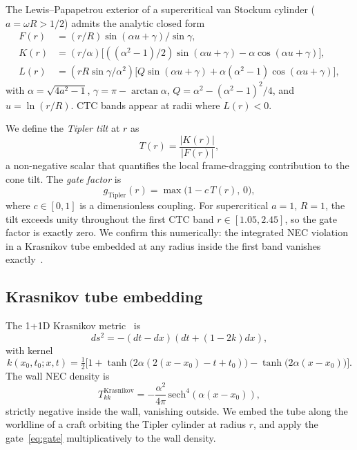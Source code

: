\documentclass[11pt,a4paper]{article}
\begin{document}
The Lewis--Papapetrou exterior of a supercritical van Stockum cylinder ($a=\omega R>1/2$) admits the analytic closed form
\begin{align}
F(r) &= (r/R)\sin(\alpha u+\gamma)/\sin\gamma, \\
K(r) &= (r/\alpha)\bigl[((\alpha^{2}-1)/2)\sin(\alpha u+\gamma) - \alpha\cos(\alpha u+\gamma)\bigr], \\
L(r) &= (rR\sin\gamma/\alpha^{2})\bigl[Q\sin(\alpha u+\gamma) + \alpha(\alpha^{2}-1)\cos(\alpha u+\gamma)\bigr],
\end{align}
with $\alpha=\sqrt{4a^{2}-1}$, $\gamma=\pi-\arctan\alpha$, $Q=\alpha^{2}-(\alpha^{2}-1)^{2}/4$, and $u=\ln(r/R)$. CTC bands appear at radii where $L(r)<0$.

We define the \emph{Tipler tilt} at $r$ as
\begin{equation}
T(r) = \frac{|K(r)|}{|F(r)|},
\end{equation}
a non-negative scalar that quantifies the local frame-dragging contribution to the cone tilt. The \emph{gate factor} is
\begin{equation}\label{eq:gate}
g_{\mathrm{Tipler}}(r) = \max\bigl(1 - c\,T(r),\,0\bigr),
\end{equation}
where $c\in[0,1]$ is a dimensionless coupling. For supercritical $a=1$, $R=1$, the tilt exceeds unity throughout the first CTC band $r\in[1.05,2.45]$, so the gate factor is exactly zero. We confirm this numerically: the integrated NEC violation in a Krasnikov tube embedded at any radius inside the first band vanishes exactly~\cite{SystropheRepo}.

\subsection{Krasnikov tube embedding}\label{ssec:krasnikov}

The 1+1D Krasnikov metric~\cite{Krasnikov1995, EverettRoman1997} is
\begin{equation}
ds^{2} = -(dt-dx)(dt+(1-2k)dx),
\end{equation}
with kernel
\begin{equation}
k(x_{0},t_{0};x,t) = \tfrac{1}{2}\!\bigl[1 + \tanh\!\bigl(2\alpha(2(x-x_{0}) - t + t_{0})\bigr) - \tanh\!\bigl(2\alpha(x-x_{0})\bigr)\bigr].
\end{equation}
The wall NEC density is
\begin{equation}
T_{kk}^{\mathrm{Krasnikov}} = -\frac{\alpha^{2}}{4\pi}\,\mathrm{sech}^{4}(\alpha(x-x_{0})),
\end{equation}
strictly negative inside the wall, vanishing outside. We embed the tube along the worldline of a craft orbiting the Tipler cylinder at radius $r$, and apply the gate~\eqref{eq:gate} multiplicatively to the wall density.
\end{document}
